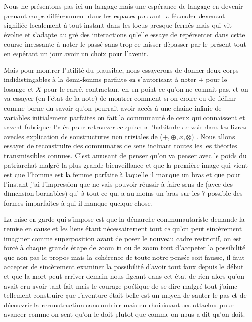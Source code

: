 \documentclass{article}
\begin{document}
Nous ne présentons pas ici un langage mais une espérance de langage en devenir  prenant corps  différemment dans les espaces  pouvant la féconder  devenant signifiée localement à tout instant dans les locus presque fermés mais qui vit évolue et s'adapte au gré des interactions qu'elle essaye de repérsenter dans cette course incessante à noter le passé sans trop ce laisser dépasser par le présent tout en espérant un jour avoir un choix pour l'avenir. 

Mais pour montrer l'utilité du plausible, nous essayerons de donner deux corps indidistingables à la demi-femme parfaite  en s'autorisant  à noter $+$ pour le losange et $X$ pour le carré, contractant en un point ce qu'on ne connait pas,
et on va essayer (en l'état de la note) de  montrer comment si on croire ou de définir comme borne du savoir qu'on pourrait avoir accès à une chaine infinie de variables initialement parfaites on fait la communauté de ceux qui connaissent et savent fabriquer l'aléa pour retrouver  ce qu'on a l'habitude de voir dans les livres.   avecles explication de soustructures non triviales de   ($ +,\oplus,x,\otimes)$ . Nous allons essayer de reconstruire des communatés de sens incluant toutes les les théories transmissibles connues. C'est amusant de penser qu'on va penser avec le poids du patriarchat malgré la plus grande bienveillance et que la première image qui vient est que l'homme est la femme parfaite à laquelle il manque un bras et que  pour l'instant j'ai l'impression que  ne vais pouvoir  réussir à faire sens  de (avec des dimension bornables) qu' à tout ce qui a au moins un bras sur les 7 possible des formes imparfaites à qui il manque quelque chose.

La mise en garde qui s'impose est que la démarche communautariste  demande la remise en cause et les liens étant nécessairement tout ce qu'on peut sincèrement imaginer comme superposition avant de poser le nouveau cadre restrictif, on est forcé à chaque grande étape de zoom in ou de zoom tout d'accpeter la possibilité que non pas le propos mais la cohérence de toute notre pensée soit fausse, il faut accepter de sincèrement examiner la possibilité d'avoir tout faux depuis le début et que la mort peut arriver demain nous figeant dans cet état de rien alors qu'on avait cru avoir tant fait mais  le courage poétique de se dire malgré tout j'aime tellement construire que l'aventure était belle est un moyen de sauter le pas et de découvrir la reconstruction sans oublier  mais en choisissant ses attaches pour avancer comme on sent qu'on le doit plutot que comme on nous a dit qu'on doit. 
\end{document}
